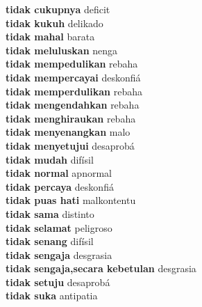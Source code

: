 \textbf{ tidak cukupnya  } deficit \\
\textbf{ tidak kukuh  } delikado \\
\textbf{ tidak mahal  } barata \\
\textbf{ tidak meluluskan  } nenga \\
\textbf{ tidak mempedulikan  } rebaha \\
\textbf{ tidak mempercayai  } deskonfiá \\
\textbf{ tidak memperdulikan  } rebaha \\
\textbf{ tidak mengendahkan  } rebaha \\
\textbf{ tidak menghiraukan  } rebaha \\
\textbf{ tidak menyenangkan  } malo \\
\textbf{ tidak menyetujui  } desaprobá \\
\textbf{ tidak mudah  } difísil \\
\textbf{ tidak normal  } apnormal \\
\textbf{ tidak percaya  } deskonfiá \\
\textbf{ tidak puas hati  } malkontentu \\
\textbf{ tidak sama  } distinto \\
\textbf{ tidak selamat  } peligroso \\
\textbf{ tidak senang  } difísil \\
\textbf{ tidak sengaja  } desgrasia \\
\textbf{ tidak sengaja,secara kebetulan  } desgrasia \\
\textbf{ tidak setuju  } desaprobá \\
\textbf{ tidak suka  } antipatia \\
